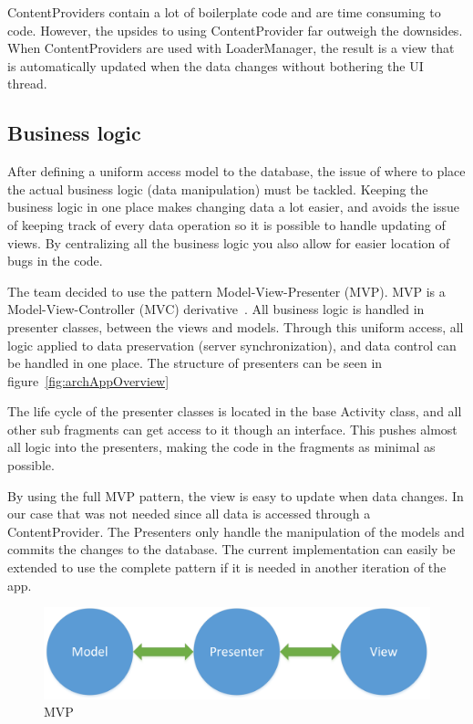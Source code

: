ContentProviders contain a lot of boilerplate code and are time consuming to code. However, the upsides to using ContentProvider far outweigh the downsides. When ContentProviders are used with LoaderManager, the result is a view that is automatically updated when the data changes without bothering the UI thread. 

\subsection{Business logic}
After defining a uniform access model to the database, the issue of where to place the actual business logic (data manipulation) must be tackled. Keeping the business logic in one place makes changing data a lot easier, and avoids the issue of keeping track of every data operation so it is possible to handle updating of views. By centralizing all the business logic you also allow for easier location of bugs in the code.

The team decided to use the pattern Model-View-Presenter (MVP). MVP is a Model-View-Controller (MVC) derivative~\cite{mvc}. All business logic is handled in presenter classes, between the views and models. Through this uniform access, all logic applied to data preservation (server synchronization), and data control can be handled in one place. The structure of presenters can be seen in figure~\ref{fig:archAppOverview}

The life cycle of the presenter classes is located in the base Activity class, and all other sub fragments can get access to it though an interface. 
This pushes almost all logic into the presenters, making the code in the fragments as minimal as possible. 

By using the full MVP pattern, the view is easy to update when data changes. In our case that was not needed since all data is accessed through a ContentProvider. The Presenters only handle the manipulation of the models and commits the changes to the database. The current implementation can easily be extended to use the complete pattern if it is needed in another iteration of the app.  

\begin{figure}[H]
\includegraphics[width=\textwidth]{ch/architecture/fig/mvp.png}
\caption{MVP}
\label{fig:mvp}
\end{figure}

